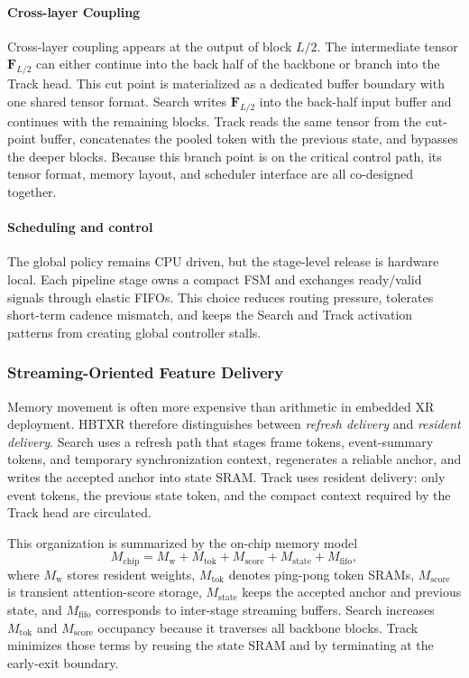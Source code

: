 \documentclass[journal]{IEEEtran}
\begin{document}
\paragraph*{Cross-layer Coupling}
Cross-layer coupling appears at the output of block $L/2$. The intermediate tensor $\mathbf F_{L/2}$ can either continue into the back half of the backbone or branch into the Track head. This cut point is materialized as a dedicated buffer boundary with one shared tensor format. Search writes $\mathbf F_{L/2}$ into the back-half input buffer and continues with the remaining blocks. Track reads the same tensor from the cut-point buffer, concatenates the pooled token with the previous state, and bypasses the deeper blocks. Because this branch point is on the critical control path, its tensor format, memory layout, and scheduler interface are all co-designed together.

\paragraph*{Scheduling and control}
The global policy remains CPU driven, but the stage-level release is hardware local. Each pipeline stage owns a compact FSM and exchanges ready/valid signals through elastic FIFOs. This choice reduces routing pressure, tolerates short-term cadence mismatch, and keeps the Search and Track activation patterns from creating global controller stalls.

\subsubsection{Streaming-Oriented Feature Delivery}
Memory movement is often more expensive than arithmetic in embedded XR deployment. HBTXR therefore distinguishes between \emph{refresh delivery} and \emph{resident delivery}. Search uses a refresh path that stages frame tokens, event-summary tokens, and temporary synchronization context, regenerates a reliable anchor, and writes the accepted anchor into state SRAM. Track uses resident delivery: only event tokens, the previous state token, and the compact context required by the Track head are circulated.

This organization is summarized by the on-chip memory model
\begin{equation}
M_{\mathrm{chip}} = M_{\mathrm{w}} + M_{\mathrm{tok}} + M_{\mathrm{score}}
+ M_{\mathrm{state}} + M_{\mathrm{fifo}},
\end{equation}
where $M_{\mathrm{w}}$ stores resident weights, $M_{\mathrm{tok}}$ denotes ping-pong token SRAMs, $M_{\mathrm{score}}$ is transient attention-score storage, $M_{\mathrm{state}}$ keeps the accepted anchor and previous state, and $M_{\mathrm{fifo}}$ corresponds to inter-stage streaming buffers. Search increases $M_{\mathrm{tok}}$ and $M_{\mathrm{score}}$ occupancy because it traverses all backbone blocks. Track minimizes those terms by reusing the state SRAM and by terminating at the early-exit boundary.
\end{document}
